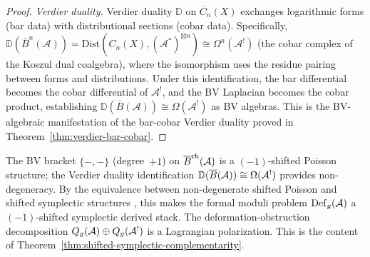 \begin{proof}
\emph{Verdier duality.}  Verdier duality $\mathbb{D}$ on $\overline{C}_n(X)$ exchanges logarithmic forms (bar data) with distributional sections (cobar data).  Specifically, $\mathbb{D}(\bar{B}^n(\mathcal{A})) = \mathrm{Dist}(C_n(X), (\mathcal{A}^*)^{\boxtimes n}) \cong \Omega^n(\mathcal{A}^!)$ (the cobar complex of the Koszul dual coalgebra), where the isomorphism uses the residue pairing between forms and distributions.  Under this identification, the bar differential becomes the cobar differential of $\mathcal{A}^!$, and the BV Laplacian becomes the cobar product, establishing $\mathbb{D}(\bar{B}(\mathcal{A})) \cong \Omega(\mathcal{A}^!)$ as BV algebras.  This is the BV-algebraic manifestation of the bar-cobar Verdier duality proved in Theorem~\ref{thm:verdier-bar-cobar}.
\end{proof}

\begin{remark}\label{rem:bv-shifted-symplectic}
The BV bracket $\{-,-\}$ (degree~$+1$) on $\overline{B}^{\mathrm{ch}}(\mathcal{A})$
is a $(-1)$-shifted Poisson structure; the Verdier duality
identification $\mathbb{D}(\overline{B}(\mathcal{A})) \cong \Omega(\mathcal{A}^!)$
provides non-degeneracy.  By the equivalence between non-degenerate
shifted Poisson and shifted symplectic structures
\cite{CPTVV17}, this makes the formal moduli problem
$\mathrm{Def}_g(\mathcal{A})$ a $(-1)$-shifted symplectic derived stack.
The deformation-obstruction decomposition
$Q_g(\mathcal{A}) \oplus Q_g(\mathcal{A}^!)$ is a Lagrangian polarization.
This is the content of
Theorem~\ref{thm:shifted-symplectic-complementarity}.
\end{remark}
